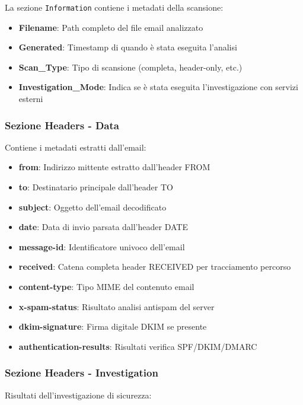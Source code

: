 \documentclass{article}
\begin{document}
La sezione \texttt{Information} contiene i metadati della scansione:

\begin{itemize}
    \item \textbf{Filename}: Path completo del file email analizzato
    \item \textbf{Generated}: Timestamp di quando è stata eseguita l'analisi
    \item \textbf{Scan\_Type}: Tipo di scansione (completa, header-only, etc.)
    \item \textbf{Investigation\_Mode}: Indica se è stata eseguita l'investigazione con servizi esterni
\end{itemize}

\subsubsection{Sezione Headers - Data}

Contiene i metadati estratti dall'email:

\begin{itemize}
    \item \textbf{from}: Indirizzo mittente estratto dall'header FROM
    \item \textbf{to}: Destinatario principale dall'header TO
    \item \textbf{subject}: Oggetto dell'email decodificato
    \item \textbf{date}: Data di invio parsata dall'header DATE
    \item \textbf{message-id}: Identificatore univoco dell'email
    \item \textbf{received}: Catena completa header RECEIVED per tracciamento percorso
    \item \textbf{content-type}: Tipo MIME del contenuto email
    \item \textbf{x-spam-status}: Risultato analisi antispam del server
    \item \textbf{dkim-signature}: Firma digitale DKIM se presente
    \item \textbf{authentication-results}: Risultati verifica SPF/DKIM/DMARC
\end{itemize}

\subsubsection{Sezione Headers - Investigation}

Risultati dell'investigazione di sicurezza:
\end{document}

